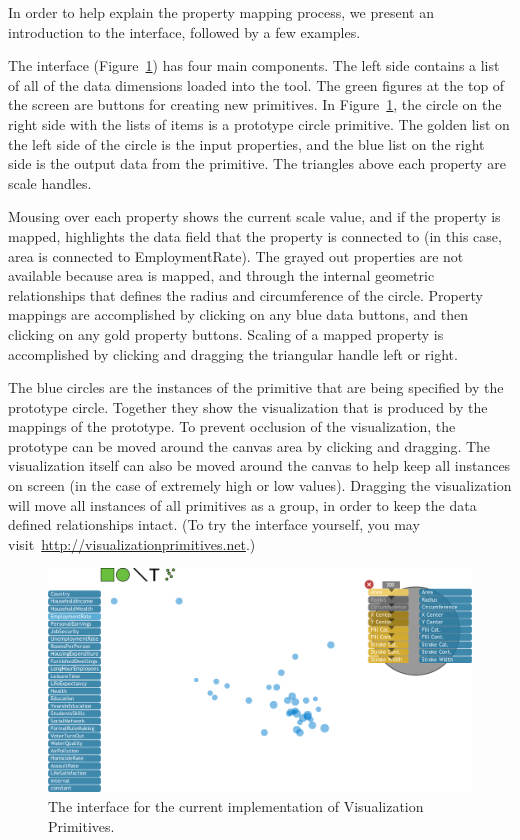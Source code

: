 \label{examples}

In order to help explain the property mapping process, we present an introduction to the interface, followed by a few examples.

The interface (Figure~\ref{fig:interface}) has four main components.
The left side contains a list of all of the data dimensions loaded into the tool.
The green figures at the top of the screen are buttons for creating new primitives.
In Figure~\ref{fig:interface}, the circle on the right side with the lists of items is a prototype circle primitive.
The golden list on the left side of the circle is the input properties, and the blue list on the right side is the output data from the primitive.
The triangles above each property are scale handles.

Mousing over each property shows the current scale value, and if the property is mapped, highlights the data field that the property is connected to (in this case, area is connected to EmploymentRate).
The grayed out properties are not available because area is mapped, and through the internal geometric relationships that defines the radius and circumference of the circle.
Property mappings are accomplished by clicking on any blue data buttons, and then clicking on any gold property buttons.
Scaling of a mapped property is accomplished by clicking and dragging the triangular handle left or right.

The blue circles are the instances of the primitive that are being specified by the prototype circle.
Together they show the visualization that is produced by the mappings of the prototype.
To prevent occlusion of the visualization, the prototype can be moved around the canvas area by clicking and dragging.
The visualization itself can also be moved around the canvas to help keep all instances on screen (in the case of extremely high or low values).
Dragging the visualization will move all instances of all primitives as a group, in order to keep the data defined relationships intact.
(To try the interface yourself, you may visit~\url{http://visualizationprimitives.net}.)

\begin{figure}[t]
\centering
\includegraphics[width=\textwidth]{images/interface.pdf}
\caption{The interface for the current implementation of Visualization Primitives.}
\label{fig:interface}
\end{figure}

